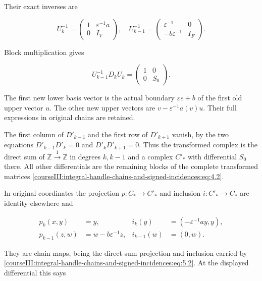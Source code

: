 Their exact inverses are

\begin{equation}
U_k^{-1}=\begin{pmatrix}1&\varepsilon^{-1}a\\0&I_V\end{pmatrix},
 \quad U_{k-1}^{-1}=
 \begin{pmatrix}\varepsilon^{-1}&0\\-b\varepsilon^{-1}&I_F\end{pmatrix}.
 \label{courseIII:integral-handle-chains-and-signed-incidences:eq:5.3}
\end{equation}

Block multiplication gives

\begin{equation}
U_{k-1}^{-1}D_kU_k=\begin{pmatrix}1&0\\0&S_0\end{pmatrix}.
 \label{courseIII:integral-handle-chains-and-signed-incidences:eq:5.4}
\end{equation}

The first new lower basis vector is the actual boundary \(\varepsilon e+b\) of the first old upper vector \(u\). The other new upper vectors are \(v-\varepsilon^{-1}a(v)u\). Their full expressions in original chains are retained.

The first column of \(D'_{k-1}\) and the first row of \(D'_{k+1}\) vanish, by the two equations \(D'_{k-1}D'_k=0\) and \(D'_kD'_{k+1}=0\). Thus the transformed complex is the direct sum of \(\mathbb Z\xrightarrow{1}\mathbb Z\) in degrees \(k,k-1\) and a complex \(C'_*\) with differential \(S_0\) there. All other differentials are the remaining blocks of the complete transformed matrices \eqref{courseIII:integral-handle-chains-and-signed-incidences:eq:4.2}.

In original coordinates the projection \(p:C_*\to C'_*\) and inclusion \(i:C'_*\to C_*\) are identity elsewhere and

\begin{equation}
\begin{aligned}
 p_k(x,y)&=y,&i_k(y)&=(-\varepsilon^{-1}ay,y),\\
 p_{k-1}(z,w)&=w-b\varepsilon^{-1}z,&
 i_{k-1}(w)&=(0,w).
 \end{aligned}
 \label{courseIII:integral-handle-chains-and-signed-incidences:eq:5.5}
\end{equation}

They are chain maps, being the direct-sum projection and inclusion carried by \eqref{courseIII:integral-handle-chains-and-signed-incidences:eq:5.2}. At the displayed differential this says

